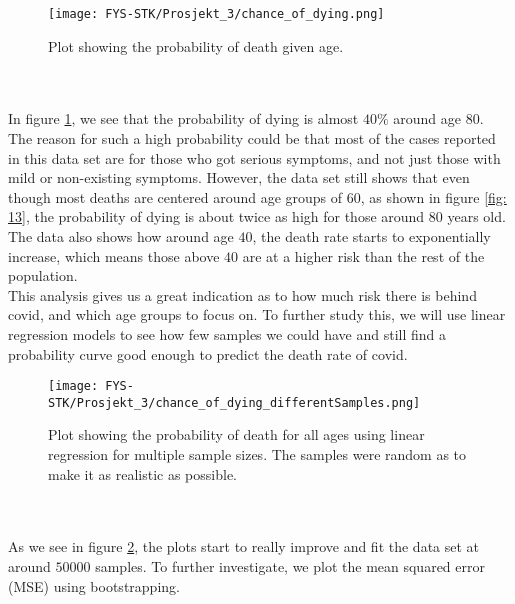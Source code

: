 \documentclass[english,notitlepage,reprint,nofootinbib]{revtex4-1}  %
\begin{document}
\begin{figure}[H]
    \centering
    \texttt{[image: FYS-STK/Prosjekt\_3/chance\_of\_dying.png]}
    \caption{Plot showing the probability of death given age.}
    \label{fig: 14}
\end{figure}
\\
\\
In figure \ref{fig: 14}, we see that the probability of dying is almost $40 \%$ around age 80. The reason for such a high probability could be that most of the cases reported in this data set are for those who got serious symptoms, and not just those with mild or non-existing symptoms. However, the data set still shows that even though most deaths are centered around age groups of $60$, as shown in figure \ref{fig: 13}, the probability of dying is about twice as high for those around $80$ years old. The data also shows how around age $40$, the death rate starts to exponentially increase, which means those above $40$ are at a higher risk than the rest of the population. 
\\
This analysis gives us a great indication as to how much risk there is behind covid, and which age groups to focus on. To further study this, we will use linear regression models to see how few samples we could have and still find a probability curve good enough to predict the death rate of covid.
\begin{figure}[H]
    \centering
    \texttt{[image: FYS-STK/Prosjekt\_3/chance\_of\_dying\_differentSamples.png]}
    \caption{Plot showing the probability of death for all ages using linear regression for multiple sample sizes. The samples were random as to make it as realistic as possible.}
    \label{fig: 15}
\end{figure}
\\
\\
As we see in figure \ref{fig: 15}, the plots start to really improve and fit the data set at around $50 000$ samples. To further investigate, we plot the mean squared error (MSE) using bootstrapping. 
\end{document}
